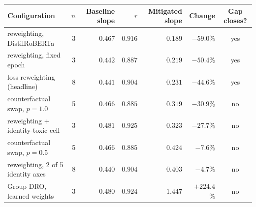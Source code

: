 \begin{tabular}{lrrrrrc}
\toprule
Configuration & $n$ & Baseline slope & $r$ & Mitigated slope & Change & Gap closes? \\
\midrule
reweighting, DistilRoBERTa & 3 & $0.467$ & $0.916$ & $0.189$ & $-59.0$\% & yes \\
reweighting, fixed epoch & 3 & $0.442$ & $0.887$ & $0.219$ & $-50.4$\% & yes \\
loss reweighting (headline) & 8 & $0.441$ & $0.904$ & $0.231$ & $-44.6$\% & yes \\
counterfactual swap, $p=1.0$ & 5 & $0.466$ & $0.885$ & $0.319$ & $-30.9$\% & no \\
reweighting $+$ identity-toxic cell & 3 & $0.481$ & $0.925$ & $0.323$ & $-27.7$\% & no \\
counterfactual swap, $p=0.5$ & 5 & $0.466$ & $0.885$ & $0.424$ & $-7.6$\% & no \\
reweighting, 2 of 5 identity axes & 8 & $0.440$ & $0.904$ & $0.403$ & $-4.7$\% & no \\
Group DRO, learned weights & 3 & $0.480$ & $0.924$ & $1.447$ & $+224.4$\% & no \\
\bottomrule
\end{tabular}
